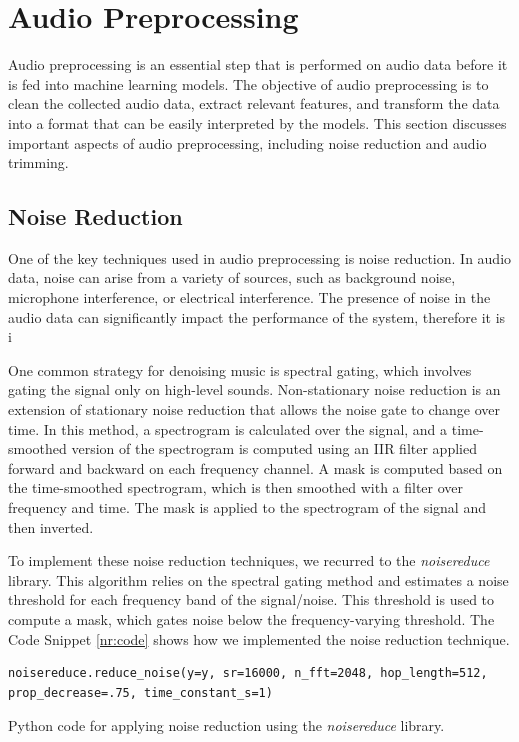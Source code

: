 \section{Audio Preprocessing}


Audio preprocessing is an essential step that is performed on audio data before it is fed into machine learning models. The objective of audio preprocessing is to clean the collected audio data, extract relevant features, and transform the data into a format that can be easily interpreted by the models. This section discusses important aspects of audio preprocessing, including noise reduction and audio trimming.


\subsection{Noise Reduction}

One of the key techniques used in audio preprocessing is noise reduction. In audio data, noise can arise from a variety of sources, such as background noise, microphone interference, or electrical interference. The presence of noise in the audio data can significantly impact the performance of the system, therefore it is i

One common strategy for denoising music is spectral gating, which involves gating the signal only on high-level sounds. Non-stationary noise reduction is an extension of stationary noise reduction that allows the noise gate to change over time. In this method, a spectrogram is calculated over the signal, and a time-smoothed version of the spectrogram is computed using an IIR filter applied forward and backward on each frequency channel. A mask is computed based on the time-smoothed spectrogram, which is then smoothed with a filter over frequency and time. The mask is applied to the spectrogram of the signal and then inverted.

To implement these noise reduction techniques, we recurred to the \textit{noisereduce} library. This algorithm relies on the spectral gating method and estimates a noise threshold for each frequency band of the signal/noise. This threshold is used to compute a mask, which gates noise below the frequency-varying threshold. The Code Snippet \ref{nr:code} shows how we implemented the noise reduction technique.

\begin{listing}[H]
	\begin{verbatim}
noisereduce.reduce_noise(y=y, sr=16000, n_fft=2048, hop_length=512, prop_decrease=.75, time_constant_s=1)
	\end{verbatim}
	\caption{Python code for applying noise reduction using the \textit{noisereduce} library.}
	\label{nr:code}
\end{listing}


